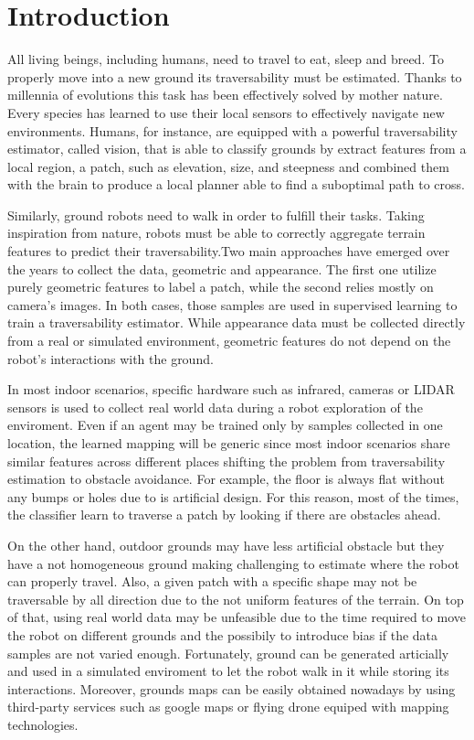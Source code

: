 \documentclass[../document.tex]{subfiles}
\begin{document}
\chapter{Introduction}

All living beings, including humans, need to travel to eat, sleep and breed. To properly move into a new ground its traversability must be estimated. Thanks to millennia of evolutions this task has been effectively solved by mother nature. Every species has learned to use their local sensors to effectively navigate new environments. Humans, for instance, are equipped with a powerful traversability estimator, called vision, that is able to classify grounds by extract features from a local region, a patch, such as elevation, size, and steepness and combined them with the brain to produce a local planner able to find a suboptimal path to cross.

Similarly, ground robots need to walk in order to fulfill their tasks. Taking inspiration from nature, robots must be able to correctly aggregate terrain features to predict their traversability.Two main approaches have emerged over the years to collect the data, geometric and appearance. The first one utilize purely geometric features to label a patch, while the second relies mostly on camera's images. In both cases, those samples are used in supervised learning to train a traversability estimator. While appearance data must be collected directly from a real or simulated environment, geometric features do not depend on the robot's interactions with the ground. 

In most indoor scenarios, specific hardware such as infrared, cameras or LIDAR sensors is used to collect real world data during a robot exploration of the enviroment. Even if an agent may be trained only by samples collected in one location, the learned mapping will be generic since most indoor scenarios share similar features across different places shifting the problem from traversability estimation to obstacle avoidance. For example, the floor is always flat without any bumps or holes due to is artificial design. For this reason, most of the times, the classifier learn to traverse a patch by looking if there are obstacles ahead.

On the other hand, outdoor grounds may have less artificial obstacle but they have a not homogeneous ground making challenging to estimate where the robot can properly travel. Also, a given patch with a specific shape may not be traversable by all direction due to the not uniform features of the terrain. On top of that, using real world data may be unfeasible due to the time required to move the robot on different grounds and the possibily to introduce bias if the data samples are not varied enough. Fortunately, ground can be generated articially and used in a simulated enviroment to let the robot walk in it while storing its interactions. Moreover, grounds maps can be easily obtained nowadays by using third-party services such as google maps or flying drone equiped with mapping technologies.
\end{document}

